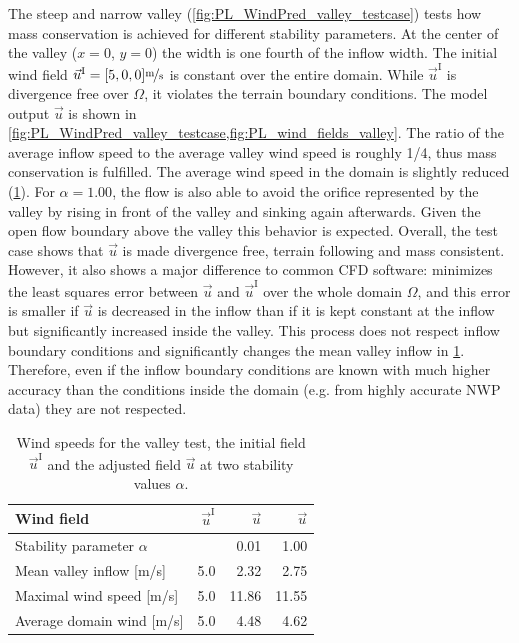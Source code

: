 \documentclass[twocolumn,letterpaper]{IEEEAerospaceCLS}
\begin{document}
The steep and narrow valley (\cref{fig:PL_WindPred_valley_testcase}) tests how mass conservation is achieved for different stability parameters. At the center of the valley ($x = 0$, $y = 0$) the width is one fourth of the inflow width. The initial wind field $\vec{u}^\text{I}=[5,0,0]\unitfrac[]{m}{s}$ is constant over the entire domain. While $\vec{u}^\text{I}$ is divergence free over $\Omega$, it violates the terrain boundary conditions. The model output $\vec{u}$ is shown in \cref{fig:PL_WindPred_valley_testcase,fig:PL_wind_fields_valley}. The ratio of the average inflow speed to the average valley wind speed is roughly 1/4, thus mass conservation is fulfilled. The average wind speed in the domain is slightly reduced (\cref{tab:PL_WindPred_wind_valley}). For $\alpha=1.00$, the flow is also able to avoid the orifice represented by the valley by rising in front of the valley and sinking again afterwards. Given the open flow boundary above the valley this behavior is expected. Overall, the test case shows that $\vec{u}$ is made divergence free, terrain following and mass consistent. However, it also shows a major difference to common \ac{CFD} software:  minimizes the least squares error between $\vec{u}$ and $\vec{u}^\text{I}$ over the whole domain $\Omega$, and this error is smaller if $\vec{u}$ is decreased in the inflow than if it is kept constant at the inflow but significantly increased inside the valley. This process does not respect inflow boundary conditions and significantly changes the mean valley inflow in \cref{tab:PL_WindPred_wind_valley}. Therefore, even if the inflow boundary conditions are known with much higher accuracy than the conditions inside the domain (e.g. from highly accurate NWP data) they are not respected.

\begin{table}[!h]
\caption{Wind speeds for the valley test, the initial field $\vec{u}^\text{I}$ and the adjusted field $\vec{u}$ at two stability values $\alpha$.}
\centering
\begin{tabular}{l r r r}
\toprule
Wind field & $\vec{u}^\text{I}$ & $\vec{u}$ & $\vec{u}$ \\
\midrule
Stability parameter $\alpha$ & & 0.01 & 1.00 \\
Mean valley inflow [m/s] & 5.0 & 2.32 & 2.75 \\
Maximal wind speed [m/s] & 5.0 & 11.86 & 11.55 \\
Average domain wind [m/s] & 5.0 & 4.48 & 4.62 \\
\bottomrule
\end{tabular}
\label{tab:PL_WindPred_wind_valley}
\end{table}
\end{document}
